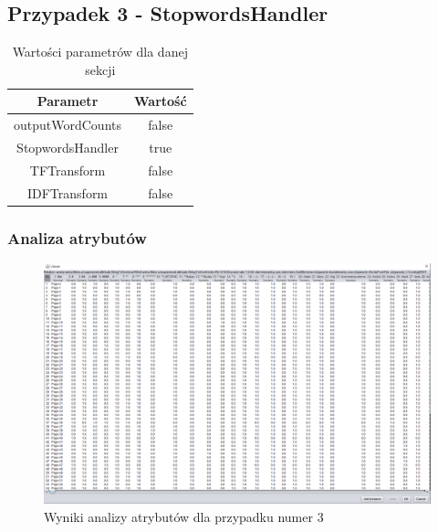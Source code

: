 \documentclass[../EDI_Task2_Karwowski_Kowalewski.tex]{subfiles}
\begin{document}
{    \subsection{Przypadek 3 - StopwordsHandler} {

        \begin{table}[!htbp]
            \small
            \centering
            \begin{tabular}{|c|c|}
                \hline
                Parametr & Wartość \\ \hline
                outputWordCounts & false \\ \hline
                StopwordsHandler & true \\ \hline
                TFTransform & false \\ \hline
                IDFTransform & false \\ \hline
            \end{tabular}
            \caption{Wartości parametrów dla danej sekcji}
        \end{table}
        \FloatBarrier

        \subsubsection{Analiza atrybutów} {

            \begin{figure}[!htbp]
                \centering
                \includegraphics[width=\textwidth]{img/results2/weeia-case3.png}
                \caption{Wyniki analizy atrybutów dla przypadku numer 3}
            \end{figure}
            \FloatBarrier
        }

}}
\end{document}
